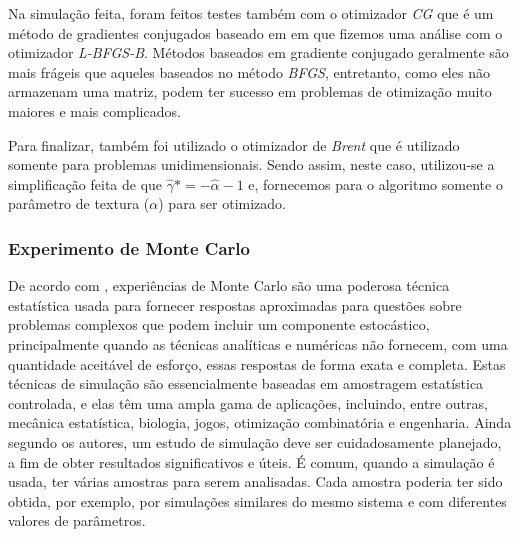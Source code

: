 \documentclass[12pt]{article}
\begin{document}
Na simulação feita, foram feitos testes também com o otimizador \emph{CG} que é um método de gradientes conjugados baseado em \citet{Fletcher64} em que fizemos uma análise com o otimizador \emph{L-BFGS-B}. Métodos baseados em gradiente conjugado geralmente são mais frágeis que aqueles baseados no método \emph{BFGS}, entretanto, como eles não armazenam uma matriz, podem ter sucesso em problemas de otimização muito maiores e mais complicados.

Para finalizar, também foi utilizado o otimizador de \emph{Brent} que é utilizado somente para problemas unidimensionais. Sendo assim, neste caso, utilizou-se a simplificação feita de que $\hat{\gamma}* = -\hat{\alpha} - 1$ e, fornecemos para o algoritmo somente o parâmetro de textura ($\alpha$) para ser otimizado.

\subsubsection{Experimento de Monte Carlo}

De acordo com \citet{busto92}, experiências de Monte Carlo são uma poderosa técnica estatística usada para fornecer respostas aproximadas para questões sobre problemas complexos que podem incluir um componente estocástico, principalmente quando as técnicas analíticas e numéricas não fornecem, com uma quantidade aceitável de esforço, essas respostas de forma exata e completa. Estas técnicas de simulação são essencialmente baseadas em amostragem estatística controlada, e elas têm uma ampla gama de aplicações, incluindo, entre outras, mecânica estatística, biologia, jogos, otimização combinatória e engenharia. Ainda segundo os autores, um estudo de simulação deve ser cuidadosamente planejado, a fim de obter resultados significativos e úteis. É comum, quando a simulação é usada, ter várias amostras para serem analisadas. Cada amostra poderia ter sido obtida, por exemplo, por simulações similares do mesmo sistema e com diferentes valores de parâmetros.  
\end{document}
